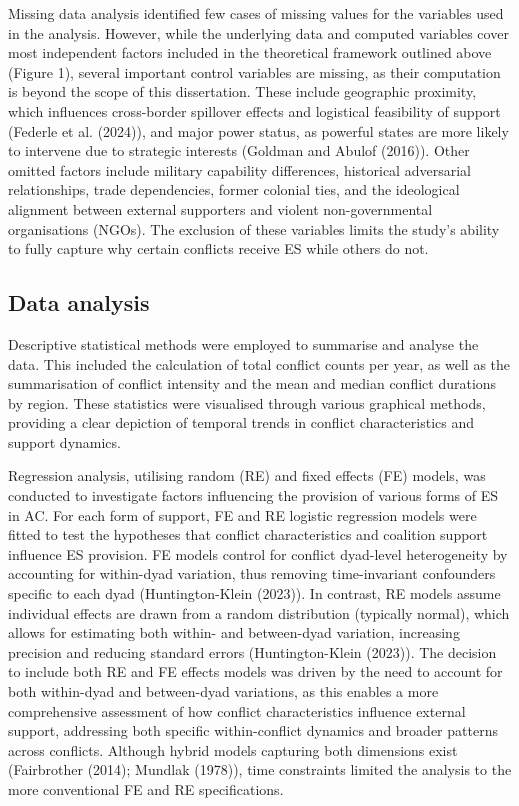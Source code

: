 \documentclass[
]{article}
\begin{document}
Missing data analysis identified few cases of missing values for the
variables used in the analysis. However, while the underlying data and
computed variables cover most independent factors included in the
theoretical framework outlined above (Figure 1), several important
control variables are missing, as their computation is beyond the scope
of this dissertation. These include geographic proximity, which
influences cross-border spillover effects and logistical feasibility of
support (Federle et al. (2024)), and major power status, as powerful
states are more likely to intervene due to strategic interests (Goldman
and Abulof (2016)). Other omitted factors include military capability
differences, historical adversarial relationships, trade dependencies,
former colonial ties, and the ideological alignment between external
supporters and violent non-governmental organisations (NGOs). The
exclusion of these variables limits the study's ability to fully capture
why certain conflicts receive ES while others do not.

\subsection{Data analysis}\label{data-analysis}

Descriptive statistical methods were employed to summarise and analyse
the data. This included the calculation of total conflict counts per
year, as well as the summarisation of conflict intensity and the mean
and median conflict durations by region. These statistics were
visualised through various graphical methods, providing a clear
depiction of temporal trends in conflict characteristics and support
dynamics.

Regression analysis, utilising random (RE) and fixed effects (FE)
models, was conducted to investigate factors influencing the provision
of various forms of ES in AC. For each form of support, FE and RE
logistic regression models were fitted to test the hypotheses that
conflict characteristics and coalition support influence ES provision.
FE models control for conflict dyad-level heterogeneity by accounting
for within-dyad variation, thus removing time-invariant confounders
specific to each dyad (Huntington-Klein (2023)). In contrast, RE models
assume individual effects are drawn from a random distribution
(typically normal), which allows for estimating both within- and
between-dyad variation, increasing precision and reducing standard
errors (Huntington-Klein (2023)). The decision to include both RE and FE
effects models was driven by the need to account for both within-dyad
and between-dyad variations, as this enables a more comprehensive
assessment of how conflict characteristics influence external support,
addressing both specific within-conflict dynamics and broader patterns
across conflicts. Although hybrid models capturing both dimensions exist
(Fairbrother (2014); Mundlak (1978)), time constraints limited the
analysis to the more conventional FE and RE specifications.
\end{document}
